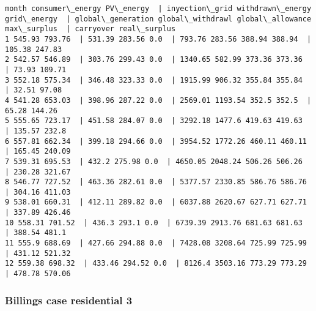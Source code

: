 \documentclass[11pt]{article}
\begin{document}
    \begin{Verbatim}[commandchars=\\\{\}]
month consumer\_energy PV\_energy  | inyection\_grid withdrawn\_energy grid\_energy  | global\_generation global\_withdrawl global\_allowance max\_surplus  | carryover real\_surplus
1 545.93 793.76  | 531.39 283.56 0.0  | 793.76 283.56 388.94 388.94  | 105.38 247.83
2 542.57 546.89  | 303.76 299.43 0.0  | 1340.65 582.99 373.36 373.36  | 73.93 109.71
3 552.18 575.34  | 346.48 323.33 0.0  | 1915.99 906.32 355.84 355.84  | 32.51 97.08
4 541.28 653.03  | 398.96 287.22 0.0  | 2569.01 1193.54 352.5 352.5  | 65.28 144.26
5 555.65 723.17  | 451.58 284.07 0.0  | 3292.18 1477.6 419.63 419.63  | 135.57 232.8
6 557.81 662.34  | 399.18 294.66 0.0  | 3954.52 1772.26 460.11 460.11  | 165.45 240.09
7 539.31 695.53  | 432.2 275.98 0.0  | 4650.05 2048.24 506.26 506.26  | 230.28 321.67
8 546.77 727.52  | 463.36 282.61 0.0  | 5377.57 2330.85 586.76 586.76  | 304.16 411.03
9 538.01 660.31  | 412.11 289.82 0.0  | 6037.88 2620.67 627.71 627.71  | 337.89 426.46
10 558.31 701.52  | 436.3 293.1 0.0  | 6739.39 2913.76 681.63 681.63  | 388.54 481.1
11 555.9 688.69  | 427.66 294.88 0.0  | 7428.08 3208.64 725.99 725.99  | 431.12 521.32
12 559.38 698.32  | 433.46 294.52 0.0  | 8126.4 3503.16 773.29 773.29  | 478.78 570.06

    \end{Verbatim}

    \hypertarget{billings-case-residential-3}{%
\subsubsection{Billings case residential
3}\label{billings-case-residential-3}}
\end{document}
